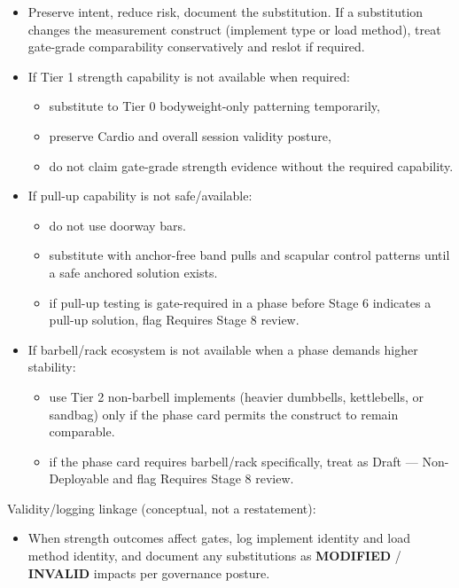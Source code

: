 \documentclass[10pt]{article}
\begin{document}
\begin{itemize}
\item Preserve intent, reduce risk, document the substitution. If a substitution changes the measurement construct (implement type or load method), treat gate-grade comparability conservatively and reslot if required.
\item If Tier 1 strength capability is not available when required:
  \begin{itemize}
  \item substitute to Tier 0 bodyweight-only patterning temporarily,
  \item preserve Cardio and overall session validity posture,
  \item do not claim gate-grade strength evidence without the required capability.
  \end{itemize}
\item If pull-up capability is not safe/available:
  \begin{itemize}
  \item do not use doorway bars.
  \item substitute with anchor-free band pulls and scapular control patterns until a safe anchored solution exists.
  \item if pull-up testing is gate-required in a phase before Stage 6 indicates a pull-up solution, flag Requires Stage 8 review.
  \end{itemize}
\item If barbell/rack ecosystem is not available when a phase demands higher stability:
  \begin{itemize}
  \item use Tier 2 non-barbell implements (heavier dumbbells, kettlebells, or sandbag) only if the phase card permits the construct to remain comparable.
  \item if the phase card requires barbell/rack specifically, treat as Draft — Non-Deployable and flag Requires Stage 8 review.
  \end{itemize}
\end{itemize}

Validity/logging linkage (conceptual, not a restatement):

\begin{itemize}
\item When strength outcomes affect gates, log implement identity and load method identity, and document any substitutions as \textbf{MODIFIED} / \textbf{INVALID} impacts per governance posture.
\end{itemize}
\end{document}
